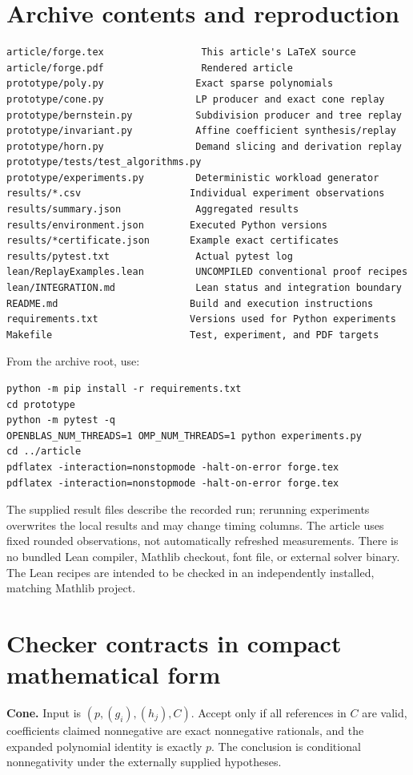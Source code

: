 \documentclass[11pt,a4paper]{article}
\begin{document}
\section{Archive contents and reproduction}
\begin{lstlisting}
article/forge.tex                 This article's LaTeX source
article/forge.pdf                 Rendered article
prototype/poly.py                Exact sparse polynomials
prototype/cone.py                LP producer and exact cone replay
prototype/bernstein.py           Subdivision producer and tree replay
prototype/invariant.py           Affine coefficient synthesis/replay
prototype/horn.py                Demand slicing and derivation replay
prototype/tests/test_algorithms.py
prototype/experiments.py         Deterministic workload generator
results/*.csv                   Individual experiment observations
results/summary.json             Aggregated results
results/environment.json        Executed Python versions
results/*certificate.json       Example exact certificates
results/pytest.txt               Actual pytest log
lean/ReplayExamples.lean         UNCOMPILED conventional proof recipes
lean/INTEGRATION.md              Lean status and integration boundary
README.md                       Build and execution instructions
requirements.txt                Versions used for Python experiments
Makefile                        Test, experiment, and PDF targets
\end{lstlisting}
From the archive root, use:
\begin{lstlisting}
python -m pip install -r requirements.txt
cd prototype
python -m pytest -q
OPENBLAS_NUM_THREADS=1 OMP_NUM_THREADS=1 python experiments.py
cd ../article
pdflatex -interaction=nonstopmode -halt-on-error forge.tex
pdflatex -interaction=nonstopmode -halt-on-error forge.tex
\end{lstlisting}
The supplied result files describe the recorded run; rerunning experiments overwrites the local results and may change timing columns. The article uses fixed rounded observations, not automatically refreshed measurements. There is no bundled Lean compiler, Mathlib checkout, font file, or external solver binary. The Lean recipes are intended to be checked in an independently installed, matching Mathlib project.

\section{Checker contracts in compact mathematical form}
\textbf{Cone.} Input is $(p,(g_i),(h_j),C)$. Accept only if all references in $C$ are valid, coefficients claimed nonnegative are exact nonnegative rationals, and the expanded polynomial identity is exactly $p$. The conclusion is conditional nonnegativity under the externally supplied hypotheses.
\end{document}
